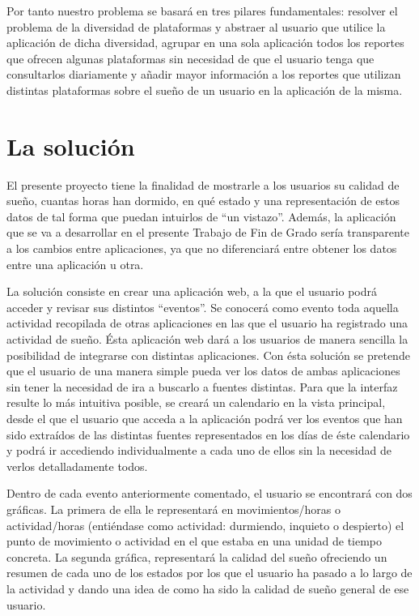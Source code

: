 \documentclass[11pt,openany]{book}
\begin{document}
Por tanto nuestro problema se basará en tres pilares fundamentales: resolver el problema de la diversidad de plataformas y abstraer al usuario que utilice la aplicación de dicha diversidad, agrupar en una sola aplicación todos los reportes que ofrecen algunas plataformas sin necesidad de que el usuario tenga que consultarlos diariamente y añadir mayor información a los reportes que utilizan distintas plataformas sobre el sueño de un usuario en la aplicación de la misma.

\section{La solución}

El presente proyecto tiene la finalidad de mostrarle a los usuarios su calidad de sueño, cuantas horas han dormido, en qué estado y una representación de estos datos de tal forma que puedan intuirlos de ``un vistazo''. Además, la aplicación que se va a desarrollar en el presente Trabajo de Fin de Grado sería transparente a los cambios entre aplicaciones, ya que no diferenciará entre obtener los datos entre una aplicación u otra.

La solución consiste en crear una aplicación web, a la que el usuario podrá acceder y revisar sus distintos ``eventos''. Se conocerá como evento toda aquella actividad recopilada de otras aplicaciones en las que el usuario ha registrado una actividad de sueño. Ésta aplicación web dará a los usuarios de manera sencilla la posibilidad de integrarse con distintas aplicaciones. Con ésta solución se pretende que el usuario de una manera simple pueda ver los datos de ambas aplicaciones sin tener la necesidad de ira a buscarlo a fuentes distintas. Para que la interfaz resulte lo más intuitiva posible, se creará un calendario en la vista principal, desde el que el usuario que acceda a la aplicación podrá ver los eventos que han sido extraídos de las distintas fuentes representados en los días de éste calendario y podrá ir accediendo individualmente a cada uno de ellos sin la necesidad de verlos detalladamente todos. 

Dentro de cada evento anteriormente comentado, el usuario se encontrará con dos gráficas. La primera de ella le representará en movimientos/horas o actividad/horas (entiéndase como actividad: durmiendo, inquieto o despierto) el punto de movimiento o actividad en el que estaba en una unidad de tiempo concreta. La segunda gráfica, representará la calidad del sueño ofreciendo un resumen de cada uno de los estados por los que el usuario ha pasado a lo largo de la actividad y dando una idea de como ha sido la calidad de sueño general de ese usuario.
\end{document}
